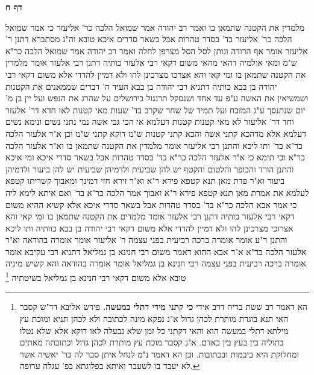 \documentclass[12pt, openany]{book}
\newcommand{\sethebfont}{
\fontsize{10.5pt}{21.0pt} \selectfont
}
\newcommand{\twocol}[1]{
	{\sethebfont \begin{multicols}{2}
			#1
	\end{multicols}}	
}
\newcommand{\sectname}{}
\newcommand{\newsection}[1]{
	\addcontentsline{toc}{section}{#1}
	\renewcommand{\sectname}{#1}	
	\vspace{-\baselineskip}
	\begin{center}
		\textbf{%
\fontsize{16pt}{16pt}\selectfont
			#1}
	\end{center}
	\vspace{-\baselineskip}
	\nopagebreak
}
\newcommand{\footnotecomment}[1]{\footnote{#1}}
\newcommand{\commenta}[1]{\footnotecomment{#1}}
\begin{document}
\newsection{דף ח}
\twocol{מלמדין את הקטנה שתמאן בו ואמר רב יהודה אמר שמואל  הלכה כר' אליעזר  כי אמר שמואל הלכה כר' אליעזר בד' בסדר טהרות אבל בשאר סדרים איכא טובא 
וה"נ מסתברא דתנן ר' אליעזר אומר  אף הרודה ונותן לסל הסל מצרפן לחלה  ואמר רב יהודה אמר שמואל  הלכה כר"א ש"מ 
ומאי אולמיה דהאי מהאי  משום דקאי רבי אלעזר כותיה 
דתנן רבי אלעזר אומר  מלמדין את הקטנה שתמאן בו 
ומי קאי  והא אצרכו מצרכינן להו ולא דמיין להדדי  אלא משום דקאי רבי יהודה בן בבא כותיה 
דתניא רבי יהודה בן בבא העיד ה' דברים  שממאנים את הקטנות
ושמשיאין את האשה ע"פ עד אחד ושנסקל תרנגול בירושלים על שהרג את הנפש ועל יין בן מ' יום שנתנסך ע"ג המזבח ועל תמיד של שחר שקרב בד' שעות 
מאי קטנות לאו חדא דר' אלעזר וחד דר' אליעזר  לא מאי קטנות קטנות דעלמא 
אי הכי גבי אשה נמי נתני נשים ונימא נשים דעלמא אלא מדהכא קתני אשה והכא קתני קטנות ש"מ  דוקא קתני ש"מ 
וכן א"ר אלעזר  הלכה כר"א בד'  ותו ליכא  והתנן רבי אליעזר אומר  מלמדין את הקטנה שתמאן בו וא"ר אלעזר  הלכה כר"א  וכי תימא  כי א"ר אלעזר הלכה כר"א בד' בסדר טהרות אבל בשאר סדרי איכא ומי איכא 
והתנן  הורד והכופר והלטום והקטף יש להן שביעית ולדמיהן שביעית יש להן ביעור ולדמיהן ביעור  וא"ר פדת  מאן תנא קטפא פירא ר"א 
וא"ר זירא  חזי דמינך ומאבוך קשריתו קטפא לעלמא את אמרת מאן תנא קטפא פירא ר"א ואבוך אמר הלכה כר"א בד' 
ואם איתא לימא ליה  כי אמר אבא הלכה כר"א בד' בסדר טהרות אבל בשאר סדרי איכא 
אלא קשיא ההיא  משום דקאי רבי אלעזר כותיה דתנן רבי אלעזר אומר  מלמדים את הקטנה שתמאן בו 
ומי קאי  והא אצרוכי מצרכינן להו ולא דמיין להדדי  אלא משום דקאי רבי יהודה בן בבא כוותיה 
ותו ליכא  והתנן ר"ע אומר  אומרה ברכה רביעית בפני עצמה ר' אליעזר אומר  אומרה בהודאה  וא"ר אלעזר  הלכה כר"א 
א"ר אבא  ההוא דאמר משום רבי חנינא בן גמליאל דתניא רבי עקיבא אומר  אומרה ברכה רביעית בפני עצמה רבי חנינא בן גמליאל אומר  אומרה בהודאה
והא קשיש מיניה טובא  אלא  משום דקאי רבי חנינא בן גמליאל בשיטתיה 
\commenta{ הא דאמר רב ששת בריה דרב אידי \textbf{כי קתני מידי דתלי במעשה.}  פירש אליבא דר"ש קסבר האי תנא בוגרת מותרת לכהן גדול א"נ נפקא מינה לכתובה ולא לכהן תניא ומוכת עץ מילתא דתלי במעשה הוא והאי דקתני כל זמן שלא נבעלה לאו דוקא אלא שלא נטלו בתוליה בין בעץ בין באדם. א"נ קסבר מוכת עץ מותרת לכהן גדול וכתובתה מאתים ומחלוקת היא ביבמות ובכתובות. וכן הא דאמר נ"מ לנחל איתן סבר לה כר' יאשיה אשר לא יעבד בו לשעבר ואיתא בפלוגתא בפ' עגלה ערופה. }

}
\end{document}
